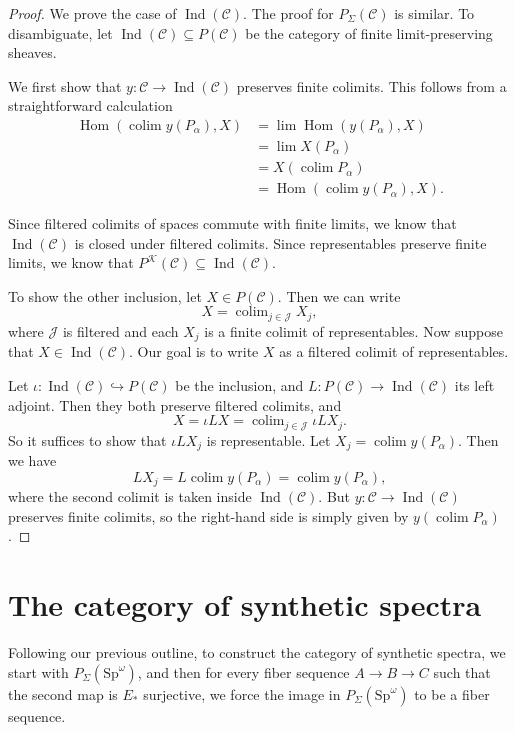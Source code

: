 \documentclass{shortart}
\theoremstyle{definition}
\newcommand\C{{\mathcal{C}}}
\newcommand\Sp{{\mathrm{Sp}}}
\DeclareMathOperator\Hom{Hom}
\DeclareMathOperator\Ind{Ind}
\DeclareMathOperator*\colim{colim}
\begin{document}
\begin{proof}
  We prove the case of $\Ind(\C)$. The proof for $P_\Sigma(\C)$ is similar. To disambiguate, let $\Ind(\C) \subseteq P(\C)$ be the category of finite limit-preserving sheaves.

  We first show that $y\colon \C \to \Ind(\C)$ preserves finite colimits. This follows from a straightforward calculation
  \[
    \begin{aligned}
      \Hom\left(\colim y(P_\alpha), X\right) &= \lim \Hom(y(P_\alpha), X)\\
                                             &= \lim X(P_\alpha)\\
                                             &= X\left(\colim P_\alpha\right) \\
                                             &= \Hom\left(\colim y(P_\alpha), X\right).
    \end{aligned}
  \]

  Since filtered colimits of spaces commute with finite limits, we know that $\Ind(\C)$ is closed under filtered colimits. Since representables preserve finite limits, we know that $P^{\mathcal{K}}(\C) \subseteq \Ind(\C)$.

  To show the other inclusion, let $X \in P(\C)$. Then we can write
  \[
    X = \colim_{j \in \mathcal{J}} X_j,
  \]
  where $\mathcal{J}$ is filtered and each $X_j$ is a finite colimit of representables. Now suppose that $X \in \Ind(\C)$. Our goal is to write $X$ as a filtered colimit of representables.

  Let $\iota \colon \Ind(\C) \hookrightarrow P(\C)$ be the inclusion, and $L \colon P(\C) \to \Ind(\C)$ its left adjoint. Then they both preserve filtered colimits, and
  \[
    X = \iota LX = \colim_{j \in \mathcal{J}} \iota L X_j.
  \]
  So it suffices to show that $\iota L X_j$ is representable. Let $X_j = \colim y(P_\alpha)$. Then we have
  \[
    LX_j = L \colim y(P_\alpha) = \colim y(P_\alpha),
  \]
  where the second colimit is taken inside $\Ind(\C)$. But $y \colon \C \to \Ind(\C)$ preserves finite colimits, so the right-hand side is simply given by $y\left(\colim P_\alpha\right)$.
\end{proof}

\section{The category of synthetic spectra}\label{section:synthetic-spectra}
Following our previous outline, to construct the category of synthetic spectra, we start with $P_\Sigma(\Sp^\omega)$, and then for every fiber sequence $A \to B \to C$ such that the second map is $E_*$ surjective, we force the image in $P_\Sigma(\Sp^\omega)$ to be a fiber sequence.
\end{document}
